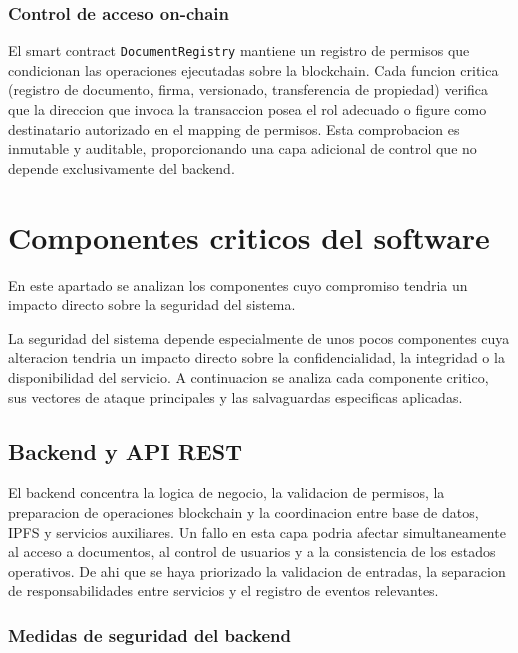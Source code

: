 \documentclass[11pt, a4paper]{article}
\begin{document}
\subsubsection{Control de acceso on-chain}

El smart contract \texttt{DocumentRegistry} mantiene un registro de permisos que condicionan las operaciones ejecutadas sobre la blockchain. Cada funcion critica (registro de documento, firma, versionado, transferencia de propiedad) verifica que la direccion que invoca la transaccion posea el rol adecuado o figure como destinatario autorizado en el mapping de permisos. Esta comprobacion es inmutable y auditable, proporcionando una capa adicional de control que no depende exclusivamente del backend.

\section{Componentes criticos del software}

En este apartado se analizan los componentes cuyo compromiso tendria un impacto directo sobre la seguridad del sistema.

La seguridad del sistema depende especialmente de unos pocos componentes cuya alteracion tendria un impacto directo sobre la confidencialidad, la integridad o la disponibilidad del servicio. A continuacion se analiza cada componente critico, sus vectores de ataque principales y las salvaguardas especificas aplicadas.

\subsection{Backend y API REST}

El backend concentra la logica de negocio, la validacion de permisos, la preparacion de operaciones blockchain y la coordinacion entre base de datos, IPFS y servicios auxiliares. Un fallo en esta capa podria afectar simultaneamente al acceso a documentos, al control de usuarios y a la consistencia de los estados operativos. De ahi que se haya priorizado la validacion de entradas, la separacion de responsabilidades entre servicios y el registro de eventos relevantes.

\subsubsection{Medidas de seguridad del backend}
\end{document}
